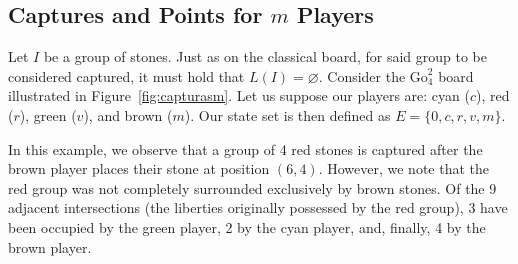 \subsection{Captures and Points for \texorpdfstring{\(m\)}{m} Players}\label{capturas_n_jug}

Let \(I\) be a group of stones. Just as on the classical board, for said group to be considered captured, it must hold that \(L(I)=\varnothing\). Consider the \(\mathrm{Go}^{2}_{4}\) board illustrated in Figure~\ref{fig:capturasm}. Let us suppose our players are: cyan (\(c\)), red (\(r\)), green (\(v\)), and brown (\(m\)). Our state set is then defined as \(E = \{0, c, r, v, m\}\).

In this example, we observe that a group of 4 red stones is captured after the brown player places their stone at position \((6,4)\). However, we note that the red group was not completely surrounded exclusively by brown stones. Of the 9 adjacent intersections (the liberties originally possessed by the red group), 3 have been occupied by the green player, 2 by the cyan player, and, finally, 4 by the brown player.

